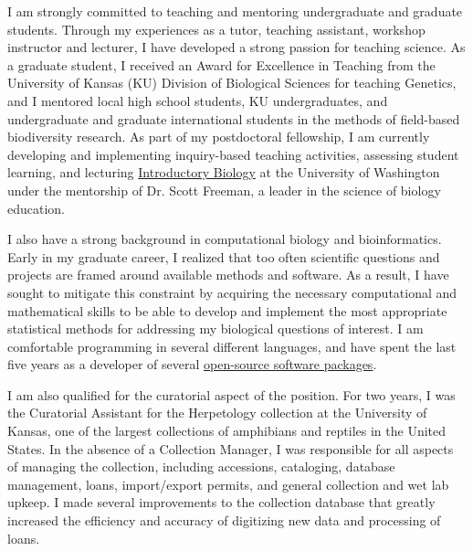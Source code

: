 \documentclass[letterpaper, 10pt]{letter}
\begin{document}
\begin{letter}
I am strongly committed to teaching and mentoring undergraduate and
graduate students.
Through my experiences as a tutor, teaching assistant, workshop instructor
and lecturer, I have developed a strong passion for teaching science.
As a graduate student, I received an Award for Excellence in Teaching from the
University of Kansas (KU) Division of Biological Sciences for teaching
Genetics, and I mentored local high school students, KU undergraduates, and
undergraduate and graduate international students in the methods of field-based
biodiversity research.
As part of my postdoctoral fellowship, I am currently developing and
implementing inquiry-based teaching activities, assessing student learning, and
lecturing \href{http://courses.biology.washington.edu/biol180/}{Introductory
    Biology} at the University of Washington under the mentorship of Dr. Scott
Freeman, a leader in the science of biology education.

I also have a strong background in computational biology and bioinformatics.
Early in my graduate career, I realized that too often scientific questions and
projects are framed around available methods and software.
As a result, I have sought to mitigate this constraint by acquiring the
necessary computational and mathematical skills to be able to develop and
implement the most appropriate statistical methods for addressing my biological
questions of interest.
I am comfortable programming in several different languages, and have spent the
last five years as a developer of several
\href{http://www.phyletica.com/?page_id=249}{open-source software packages}.

I am also qualified for the curatorial aspect of the position.
For two years, I was the Curatorial Assistant for the Herpetology
collection at the University of Kansas, one of the largest collections of
amphibians and reptiles in the United States.
In the absence of a Collection Manager, I was responsible for all aspects
of managing the collection, including accessions, cataloging, database
management, loans, import/export permits, and general collection and wet
lab upkeep.
I made several improvements to the collection database that greatly
increased the efficiency and accuracy of digitizing new data and
processing of loans.


\end{letter}
\end{document}
